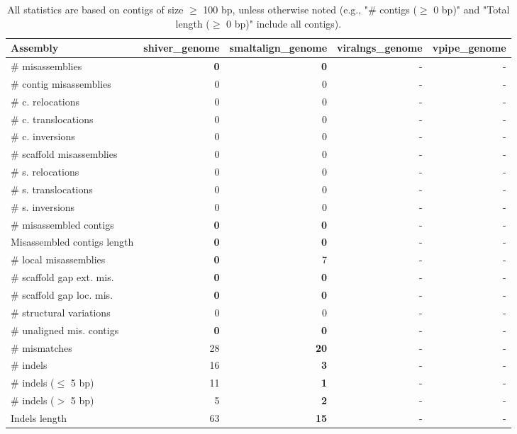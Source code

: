 \documentclass[12pt,a4paper]{article}
\begin{document}
\begin{table}[ht]
\begin{center}
\caption{All statistics are based on contigs of size $\geq$ 100 bp, unless otherwise noted (e.g., "\# contigs ($\geq$ 0 bp)" and "Total length ($\geq$ 0 bp)" include all contigs).}
\begin{tabular}{|l*{4}{|r}|}
\hline
Assembly & shiver\_genome & smaltalign\_genome & viralngs\_genome & vpipe\_genome \\ \hline
\# misassemblies & {\bf 0} & {\bf 0} & - & - \\ \hline
\hspace{2mm}\# contig misassemblies & 0 & 0 & - & - \\ \hline
\hspace{5mm}\# c. relocations & 0 & 0 & - & - \\ \hline
\hspace{5mm}\# c. translocations & 0 & 0 & - & - \\ \hline
\hspace{5mm}\# c. inversions & 0 & 0 & - & - \\ \hline
\hspace{2mm}\# scaffold misassemblies & 0 & 0 & - & - \\ \hline
\hspace{5mm}\# s. relocations & 0 & 0 & - & - \\ \hline
\hspace{5mm}\# s. translocations & 0 & 0 & - & - \\ \hline
\hspace{5mm}\# s. inversions & 0 & 0 & - & - \\ \hline
\# misassembled contigs & {\bf 0} & {\bf 0} & - & - \\ \hline
Misassembled contigs length & {\bf 0} & {\bf 0} & - & - \\ \hline
\# local misassemblies & {\bf 0} & 7 & - & - \\ \hline
\# scaffold gap ext. mis. & {\bf 0} & {\bf 0} & - & - \\ \hline
\# scaffold gap loc. mis. & {\bf 0} & {\bf 0} & - & - \\ \hline
\# structural variations & 0 & 0 & - & - \\ \hline
\# unaligned mis. contigs & {\bf 0} & {\bf 0} & - & - \\ \hline
\# mismatches & 28 & {\bf 20} & - & - \\ \hline
\# indels & 16 & {\bf 3} & - & - \\ \hline
\hspace{5mm}\# indels ($\leq$ 5 bp) & 11 & {\bf 1} & - & - \\ \hline
\hspace{5mm}\# indels ($>$ 5 bp) & 5 & {\bf 2} & - & - \\ \hline
Indels length & 63 & {\bf 15} & - & - \\ \hline
\end{tabular}
\end{center}
\end{table}
\end{document}
